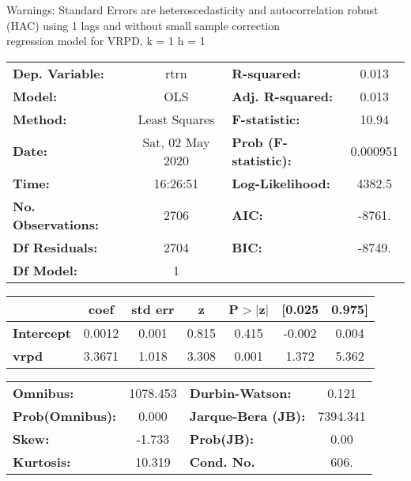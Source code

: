 Warnings: \newline
 [1] Standard Errors are heteroscedasticity and autocorrelation robust (HAC) using 1 lags and without small sample correction\\ 

regression model for VRPD, k = 1 h = 1\begin{center}
\begin{tabular}{lclc}
\toprule
\textbf{Dep. Variable:}    &       rtrn       & \textbf{  R-squared:         } &     0.013   \\
\textbf{Model:}            &       OLS        & \textbf{  Adj. R-squared:    } &     0.013   \\
\textbf{Method:}           &  Least Squares   & \textbf{  F-statistic:       } &     10.94   \\
\textbf{Date:}             & Sat, 02 May 2020 & \textbf{  Prob (F-statistic):} &  0.000951   \\
\textbf{Time:}             &     16:26:51     & \textbf{  Log-Likelihood:    } &    4382.5   \\
\textbf{No. Observations:} &        2706      & \textbf{  AIC:               } &    -8761.   \\
\textbf{Df Residuals:}     &        2704      & \textbf{  BIC:               } &    -8749.   \\
\textbf{Df Model:}         &           1      & \textbf{                     } &             \\
\bottomrule
\end{tabular}
\begin{tabular}{lcccccc}
                   & \textbf{coef} & \textbf{std err} & \textbf{z} & \textbf{P$> |$z$|$} & \textbf{[0.025} & \textbf{0.975]}  \\
\midrule
\textbf{Intercept} &       0.0012  &        0.001     &     0.815  &         0.415        &       -0.002    &        0.004     \\
\textbf{vrpd}      &       3.3671  &        1.018     &     3.308  &         0.001        &        1.372    &        5.362     \\
\bottomrule
\end{tabular}
\begin{tabular}{lclc}
\textbf{Omnibus:}       & 1078.453 & \textbf{  Durbin-Watson:     } &    0.121  \\
\textbf{Prob(Omnibus):} &   0.000  & \textbf{  Jarque-Bera (JB):  } & 7394.341  \\
\textbf{Skew:}          &  -1.733  & \textbf{  Prob(JB):          } &     0.00  \\
\textbf{Kurtosis:}      &  10.319  & \textbf{  Cond. No.          } &     606.  \\
\bottomrule
\end{tabular}
\end{center}

